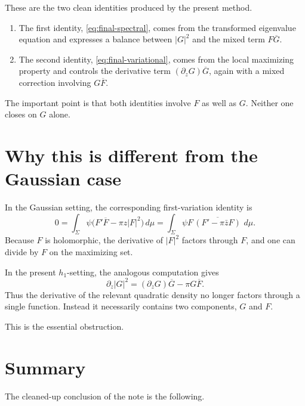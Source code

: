 \documentclass[11pt]{article}
\newcommand{\dmu}{\,d\mu}
\newcommand{\pw}{\partial_z}
\newcommand{\1}{\mathbf 1}
\begin{document}
These are the two clean identities produced by the present method.

\begin{enumerate}[label=\textnormal{(\arabic*)}]
\item The first identity, \eqref{eq:final-spectral}, comes from the transformed
eigenvalue equation and expresses a balance between \(|G|^2\) and the mixed term
\(F\overline G\).

\item The second identity, \eqref{eq:final-variational}, comes from the local
maximizing property and controls the derivative term \((\pw G)\overline G\), again
with a mixed correction involving \(G\overline F\).
\end{enumerate}

The important point is that both identities involve \(F\) as well as \(G\). Neither
one closes on \(G\) alone.

\section{Why this is different from the Gaussian case}

In the Gaussian setting, the corresponding first-variation identity is
\[
0
=
\int_\Sigma \psi\Big(F'\overline F-\pi z|F|^2\Big)\dmu
=
\int_\Sigma \psi F\,\overline{(F'-\pi\bar z F)}\,\dmu.
\]
Because \(F\) is holomorphic, the derivative of \(|F|^2\) factors through \(F\), and
one can divide by \(F\) on the maximizing set.

In the present \(h_1\)-setting, the analogous computation gives
\[
\pw |G|^2=(\pw G)\overline G-\pi G\overline F.
\]
Thus the derivative of the relevant quadratic density no longer factors through a
single function. Instead it necessarily contains two components, \(G\) and \(F\).

This is the essential obstruction.

\section{Summary}

The cleaned-up conclusion of the note is the following.
\end{document}
